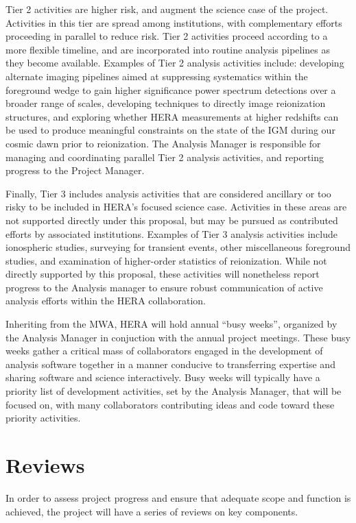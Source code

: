 \documentclass[preprint]{aastex}
\begin{document}
Tier 2 activities are higher risk, and augment the science case of the project.  Activities in
this tier are spread among institutions, with complementary efforts proceeding in parallel to
reduce risk.  Tier 2 activities proceed according to a more flexible timeline, and are incorporated
into routine analysis pipelines as they become available.  Examples of Tier 2 analysis activities
include:
developing alternate imaging pipelines aimed at suppressing systematics within the foreground wedge
to gain higher significance power spectrum detections over a broader range of scales, developing
techniques to directly image reionization structures, and exploring whether HERA measurements at
higher redshifts can be used to produce meaningful constraints on the state of the IGM during
our cosmic dawn prior to reionization.  The Analysis Manager is responsible for managing and coordinating
parallel Tier 2 analysis activities, and reporting progress to the Project Manager.

Finally, Tier 3 includes analysis activities that are considered ancillary or too risky to
be included in HERA's focused science case.
Activities in these areas are not supported directly under this proposal, but may be pursued as
contributed efforts by associated institutions.  Examples of Tier 3 analysis activities include
ionospheric studies, surveying for transient events, other miscellaneous foreground studies, and
examination of higher-order statistics of reionization.  While not directly supported by this proposal,
these activities will nonetheless report progress to the Analysis manager to ensure
robust communication of active analysis efforts within the HERA collaboration.

Inheriting from the MWA, HERA will hold annual ``busy weeks'', organized by the Analysis Manager in
conjuction with the annual project meetings.  These busy weeks gather a critical
mass of collaborators engaged in the development of analysis software together in a manner conducive to
transferring expertise and sharing software and science interactively.  Busy weeks will typically
have a priority list of development activities, set by the Analysis Manager, that will be 
focused on, with many collaborators contributing
ideas and code toward these priority activities.

\section{Reviews}
\label{sec:reviews}
In order to assess project progress and ensure that adequate scope and function is achieved,
the project will have a series of reviews on key components.
\end{document}
